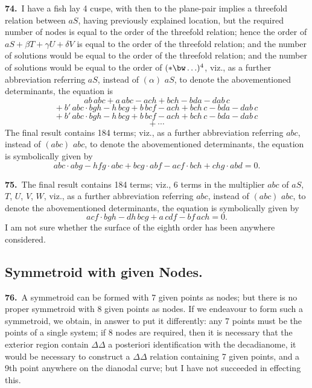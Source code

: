 \documentclass[11pt,a4paper]{article}
\begin{document}
\medskip

\textbf{74.}\ I have a fish lay 4 cuspe, with then to the plane-pair implies a threefold relation between $aS$, having previously explained location, but the required number of nodes is equal to the order of the threefold relation; hence the order of $aS + \beta T + \gamma U + \delta V$ is equal to the order of the threefold relation; and the number of solutions would be equal to the order of the threefold relation; and the number of solutions would be equal to the order of $(\ast \bw\ldots)^4$, viz., as a further abbreviation referring $aS$, instead of $(\alpha)$ $aS$, to denote the abovementioned determinants, the equation is
\[
ab\,abc + a\,abc - ach + bch - bda - dab\,c
\]
\[
+\ b'\,abc\cdot bgh - h\,bcg + b\,bcf - ach + bch\,c - bda - dab\,c
\]
\[
+\ b'\,abc\cdot bgh - h\,bcg + b\,bcf - ach + bch\,c - bda - dab\,c
\]
\[
+\ \cdots
\]
The final result contains 184 terms; viz., as a further abbreviation referring $abc$, instead of $(abc)$ $abc$, to denote the abovementioned determinants, the equation is symbolically given by
\[
abc \cdot abg - hfg \cdot abc + bcg \cdot abf - acf \cdot bch + chg \cdot abd = 0.
\]

\medskip

\textbf{75.}\ The final result contains 184 terms; viz., 6 terms in the multiplier $abc$ of $aS$, $T$, $U$, $V$, $W$, viz., as a further abbreviation referring $abc$, instead of $(abc)$ $abc$, to denote the abovementioned determinants, the equation is symbolically given by
\[
acf \cdot bgh - dh\,bcg + a\,cdf - bf\,ach = 0.
\]
I am not sure whether the surface of the eighth order has been anywhere considered.

\newpage
\setcounter{page}{162}

\subsection*{Symmetroid with given Nodes.}

\noindent\textbf{76.}\ A symmetroid can be formed with 7 given points as nodes; but there is no proper symmetroid with 8 given points as nodes. If we endeavour to form such a symmetroid, we obtain, in answer to put it differently: any 7 points must be the points of a single system; if 8 nodes are required, then it is necessary that the exterior region contain $\Delta\Delta$ a posteriori identification with the decadianome, it would be necessary to construct a $\Delta\Delta$ relation containing 7 given points, and a 9th point anywhere on the dianodal curve; but I have not succeeded in effecting this.
\end{document}
